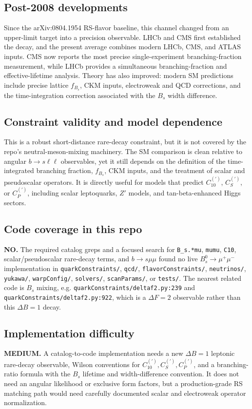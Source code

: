 \subsection*{Post-2008 developments}
Since the arXiv:0804.1954 RS-flavor baseline, this channel changed from an
upper-limit target into a precision observable.  LHCb and CMS first established
the decay, and the present average combines modern LHCb, CMS, and ATLAS inputs.
CMS now reports the most precise single-experiment branching-fraction
measurement, while LHCb provides a simultaneous branching-fraction and
effective-lifetime analysis.  Theory has also improved: modern SM predictions
include precise lattice \(f_{B_s}\), CKM inputs, electroweak and QCD
corrections, and the time-integration correction associated with the
\(B_s\) width difference.

\subsection*{Constraint validity and model dependence}
This is a robust short-distance rare-decay constraint, but it is not covered by
the repo's neutral-meson-mixing machinery.  The SM comparison is clean relative
to angular \(b\to s\ell\ell\) observables, yet it still depends on the
definition of the time-integrated branching fraction, \(f_{B_s}\), CKM inputs,
and the treatment of scalar and pseudoscalar operators.  It is directly useful
for models that predict \(C_{10}^{(\prime)}\), \(C_S^{(\prime)}\), or
\(C_P^{(\prime)}\), including scalar leptoquarks, \(Z'\) models, and
tan-beta-enhanced Higgs sectors.

\subsection*{Code coverage in this repo}
\textbf{NO.}  The required catalog greps and a focused search for
\texttt{B\_s.*mu}, \texttt{mumu}, \texttt{C10}, scalar/pseudoscalar rare-decay
terms, and \(b\to s\mu\mu\) found no live \(B_s^0\to\mu^+\mu^-\) implementation
in \texttt{quarkConstraints/}, \texttt{qcd/}, \texttt{flavorConstraints/},
\texttt{neutrinos/}, \texttt{yukawa/}, \texttt{warpConfig/},
\texttt{solvers/}, \texttt{scanParams/}, or \texttt{tests/}.  The nearest
related code is \(B_s\) mixing, e.g. \texttt{quarkConstraints/deltaf2.py:239}
and \texttt{quarkConstraints/deltaf2.py:922}, which is a \(\Delta F=2\)
observable rather than this \(\Delta B=1\) decay.

\subsection*{Implementation difficulty}
\textbf{MEDIUM.}  A catalog-to-code implementation needs a new \(\Delta B=1\)
leptonic rare-decay observable, Wilson conventions for
\(C_{10}^{(\prime)}, C_S^{(\prime)}, C_P^{(\prime)}\), and a branching-ratio
formula with the \(B_s\) lifetime and width-difference convention.  It does not
need an angular likelihood or exclusive form factors, but a production-grade
RS matching path would need carefully documented scalar and electroweak
operator normalization.

